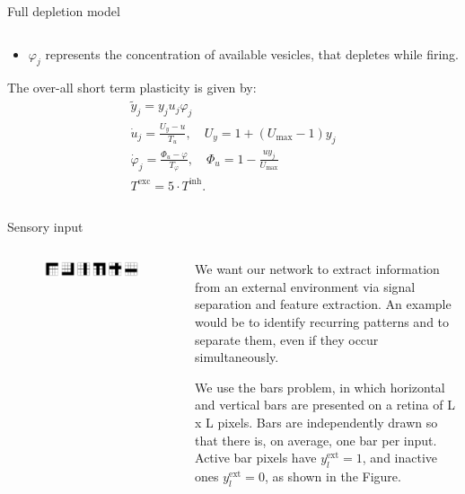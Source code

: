 \documentclass[final,hyperref={pdfpagelabels=false}]{beamer}
\begin{document}
\begin{frame}
\begin{columns}
\begin{column}{.64\textwidth}
\begin{minipage}[T]{.95\textwidth}
{\begin{block}{Full depletion model}
\begin{columns}
\begin{column}[T]{.5\textwidth}
\begin{itemize}
									\item $\varphi_j$ represents the concentration of available vesicles, that depletes while firing.
								\end{itemize}
							  The over-all short term plasticity is given by:			
								\begin{gather*}
									\tilde{y}_j = y_j u_j \varphi_j \\
									\dot{u}_j = \frac{U_y -u}{T_u}, \quad U_y = 1 + \left( U_\text{max} -1 \right) y_j\\ 
									\dot{\varphi}_j = \frac{\varPhi_u - \varphi}{T_\varphi}, \quad \varPhi_u = 1- \frac{u y_j}{U_\text{max}} \\
									T^{\text{exc}} = 5 \cdot T^{\text{inh}}.
								\end{gather*}

							\end{column}
						\end{columns}
					\end{block}
					
					\begin{block}{Sensory input}
						\begin{columns}
							\begin{column}[T]{.1\textwidth}
									\begin{figure}[T]
										\includegraphics[width=3.5\textwidth, angle=-90]{input_ex6.pdf}
																		
									\end{figure}
							\end{column}
							
							\begin{column}[T]{.9\textwidth}
								We want our network to extract information from an external environment via signal separation and feature extraction. An example would be to identify recurring patterns and to separate them, even if they occur simultaneously.
													
								We use the bars problem, in which horizontal and vertical bars are presented on a retina of L x L pixels. Bars are independently drawn so that there is, on average, one bar per input. Active bar pixels have $y_l^{\text{ext}}=1$, and inactive ones $y_l^{\text{ext}}=0$, as shown in the Figure.
														

\end{column}
\end{columns}
\end{block}}
\end{minipage}
\end{column}
\end{columns}
\end{frame}
\end{document}
